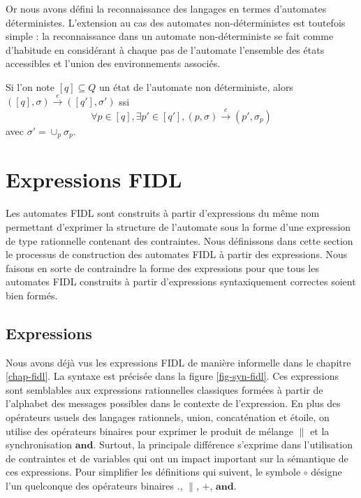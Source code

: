 Or nous avons d\'efini la reconnaissance des langages  en termes d'automates
d\'eterministes. L'extension au cas des automates
non-d\'eterministes est toutefois simple : la reconnaissance dans un automate non-d\'eterministe se fait comme
d'habitude en consid\'erant \`a chaque pas de l'automate l'ensemble
des \'etats accessibles et l'union des environnements associ\'es.

Si l'on note $[q]\subseteq Q$ un \'etat de l'automate non
d\'eterministe, alors $([q],\sigma)\xrightarrow{e} ([q'],\sigma')$
ssi
$$
\forall p \in [q], \exists p' \in [q'], (p,\sigma)\xrightarrow{e} (p',\sigma_p)
$$
avec $\sigma' = \cup_{p} \sigma_p$. 

\section{Expressions \textsf{FIDL}}

Les automates FIDL sont construits \`a partir d'expressions du
m\^eme nom permettant d'exprimer la structure de l'automate sous la
forme d'une expression de type rationnelle contenant des contraintes. Nous
d\'efinissons dans cette section le processus de construction des
automates \textsf{FIDL} \`a partir des expressions. Nous faisons en
sorte de contraindre la forme des expressions pour que tous les
automates \textsf{FIDL} construits \`a partir d'expressions
syntaxiquement correctes soient bien form\'es.

\subsection{Expressions}
\label{sec:expressions}

Nous avons d\'ej\`a vus les expressions  \textsf{FIDL} de mani\`ere
informelle dans le chapitre \ref{chap-fidl}. La syntaxe est
pr\'ecis\'ee dans la figure \ref{fig-syn-fidl}. Ces expressions sont semblables aux
expressions rationnelles classiques form\'ees \`a partir de l'alphabet des messages
possibles dans le contexte de l'expression. En plus des op\'erateurs
usuels des langages rationnels, union, concat\'enation et
\'etoile, on utilise des op\'erateurs binaires pour exprimer le
produit  de m\'elange $\|$ et la synchronisation
$\mathbf{and}$. Surtout, la principale diff\'erence s'exprime dans l'utilisation  de
contraintes et de variables qui ont un impact important sur la
s\'emantique de ces expressions. Pour simplifier les
d\'efinitions qui suivent, le symbole  $\circ$ d\'esigne l'un quelconque des op\'erateurs
binaires $.$, $\|$, $+$, $\mathbf{and}$. 

